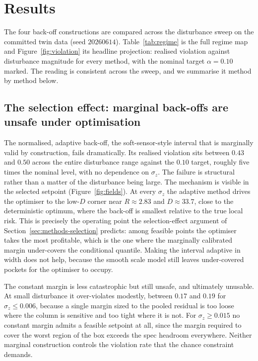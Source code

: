 \section{Results}
\label{sec:results}

The four back-off constructions are compared across the disturbance sweep on the committed
twin data (seed $20260614$). Table~\ref{tab:regime} is the full regime map and
Figure~\ref{fig:violation} its headline projection: realised violation against disturbance
magnitude for every method, with the nominal target $\alpha=0.10$ marked. The reading is
consistent across the sweep, and we summarise it method by method below.

\subsection{The selection effect: marginal back-offs are unsafe under optimisation}
\label{sec:results-selection}

The normalised, adaptive back-off, the soft-sensor-style interval that is marginally valid by
construction, fails dramatically. Its realised violation sits between $0.43$ and $0.50$ across
the entire disturbance range against the $0.10$ target, roughly five times the nominal level,
with no dependence on $\sigma_z$. The failure is structural rather than a matter of the
disturbance being large. The mechanism is visible in the selected setpoint
(Figure~\ref{fig:fields}). At every $\sigma_z$ the adaptive method drives the optimiser to the
low-$D$ corner near $R\approx2.83$ and $D\approx33.7$, close to the deterministic optimum,
where the back-off is smallest relative to the true local risk. This is precisely the
operating point the selection-effect argument of Section~\ref{sec:methods-selection} predicts:
among feasible points the optimiser takes the most profitable, which is the one where the
marginally calibrated margin under-covers the conditional quantile. Making the interval
adaptive in width does not help, because the smooth scale model still leaves under-covered
pockets for the optimiser to occupy.

The constant margin is less catastrophic but still unsafe, and ultimately unusable. At small
disturbance it over-violates modestly, between $0.17$ and $0.19$ for $\sigma_z\le0.006$,
because a single margin sized to the pooled residual is too loose where the column is sensitive
and too tight where it is not. For $\sigma_z\ge0.015$ no constant margin admits a feasible
setpoint at all, since the margin required to cover the worst region of the box exceeds the
spec headroom everywhere. Neither marginal construction controls the violation rate that the
chance constraint demands.

